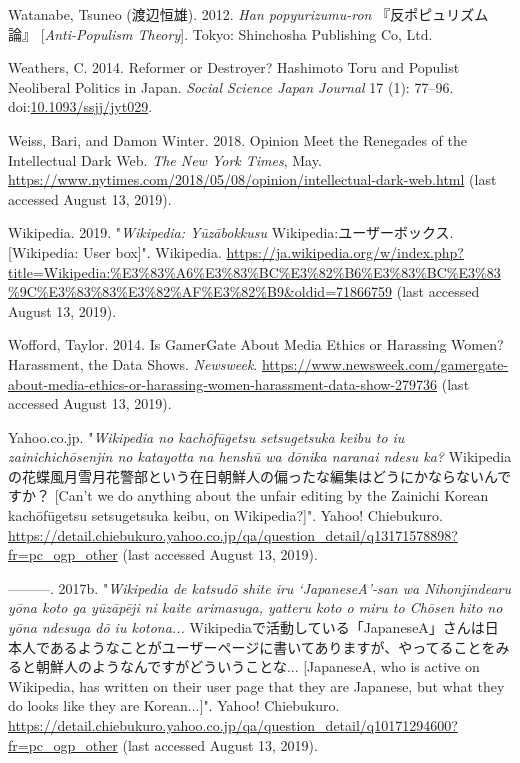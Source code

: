 \documentclass[10pt,british,A4paper,oneside]{memoir}
\begin{document}
\hypertarget{ref-watanabe_anti-populism_2012}{}
Watanabe, Tsuneo (渡辺恒雄). 2012. \emph{Han popyurizumu-ron} 『反ポピュリズム論』 [\emph{Anti-Populism Theory}]. Tokyo: Shinchosha
Publishing Co, Ltd.

\hypertarget{ref-weathers_reformer_2014}{}
Weathers, C. 2014. Reformer or Destroyer? Hashimoto Toru and Populist
Neoliberal Politics in Japan. \emph{Social Science Japan Journal} 17
(1): 77--96.
doi:\href{https://doi.org/10.1093/ssjj/jyt029}{10.1093/ssjj/jyt029}.

\hypertarget{ref-weiss_opinion_2018}{}
Weiss, Bari, and Damon Winter. 2018. Opinion Meet the Renegades of the
Intellectual Dark Web. \emph{The New York Times}, May.
\url{https://www.nytimes.com/2018/05/08/opinion/intellectual-dark-web.html} (last accessed August 13, 2019).

\hypertarget{ref-anonymous_wikipedia:_2019}{}
Wikipedia. 2019. "\emph{Wikipedia: Yūzābokkusu} Wikipedia:ユーザーボックス. [Wikipedia: User box]". Wikipedia.
\url{https://ja.wikipedia.org/w/index.php?title=Wikipedia:\%E3\%83\%A6\%E3\%83\%BC\%E3\%82\%B6\%E3\%83\%BC\%E3\%83\%9C\%E3\%83\%83\%E3\%82\%AF\%E3\%82\%B9\&oldid=71866759} (last accessed August 13, 2019).

\hypertarget{ref-wofford_is_2014}{}
Wofford, Taylor. 2014. Is GamerGate About Media Ethics or Harassing
Women? Harassment, the Data Shows. \emph{Newsweek}.
\url{https://www.newsweek.com/gamergate-about-media-ethics-or-harassing-women-harassment-data-show-279736} (last accessed August 13, 2019).

\hypertarget{ref-anonymous_cant_2017}{}
Yahoo.co.jp. "\emph{Wikipedia no kachōfūgetsu setsugetsuka keibu to iu zainichichōsenjin no katayotta na henshū wa dōnika naranai ndesu ka?} Wikipediaの花蝶風月雪月花警部という在日朝鮮人の偏ったな編集はどうにかならないんですか？ [Can't we do anything about the unfair editing by the Zainichi Korean kachōfūgetsu setsugetsuka keibu, on Wikipedia?]".
Yahoo! Chiebukuro.
\url{https://detail.chiebukuro.yahoo.co.jp/qa/question_detail/q13171578898?fr=pc_ogp_other} (last accessed August 13, 2019).

\hypertarget{ref-anonymous_japanesea_2017}{}
---------. 2017b. "\emph{Wikipedia de katsudō shite iru `JapaneseA'-san wa Nihonjindearu yōna koto ga yūzāpēji ni kaite arimasuga, yatteru koto o miru to Chōsen hito no yōna ndesuga dō iu kotona...} Wikipediaで活動している「JapaneseA」さんは日本人であるようなことがユーザーページに書いてありますが、やってることをみると朝鮮人のようなんですがどういうことな... [JapaneseA, who is active on Wikipedia, has written on their user page that they are Japanese, but what they do looks like they are Korean...]". Yahoo! Chiebukuro.
\url{https://detail.chiebukuro.yahoo.co.jp/qa/question_detail/q10171294600?fr=pc_ogp_other} (last accessed August 13, 2019).
\end{document}

